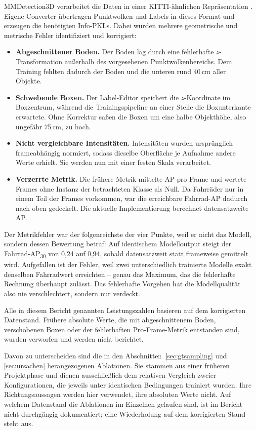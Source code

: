 MMDetection3D \cite{mmdet3d2020} verarbeitet die Daten in einer KITTI-ähnlichen Repräsentation \cite{geiger2012kitti}. Eigene Converter übertragen Punktwolken und Labels in dieses Format und erzeugen die benötigten Info-PKLs. Dabei wurden mehrere geometrische und metrische Fehler identifiziert und korrigiert:

\begin{itemize}
    \item \textbf{Abgeschnittener Boden.} Der Boden lag durch eine fehlerhafte \(z\)-Transformation außerhalb des vorgesehenen Punktwolkenbereichs. Dem Training fehlten dadurch der Boden und die unteren rund 40\,cm aller Objekte.
    \item \textbf{Schwebende Boxen.} Der Label-Editor speichert die \(z\)-Koordinate im Boxzentrum, während die Trainingspipeline an einer Stelle die Boxunterkante erwartete. Ohne Korrektur saßen die Boxen um eine halbe Objekthöhe, also ungefähr 75\,cm, zu hoch.
    \item \textbf{Nicht vergleichbare Intensitäten.} Intensitäten wurden ursprünglich frameabhängig normiert, sodass dieselbe Oberfläche je Aufnahme andere Werte erhielt. Sie werden nun mit einer festen Skala verarbeitet.
    \item \textbf{Verzerrte Metrik.} Die frühere Metrik mittelte AP pro Frame und wertete Frames ohne Instanz der betrachteten Klasse als Null. Da Fahrräder nur in einem Teil der Frames vorkommen, war die erreichbare Fahrrad-AP dadurch nach oben gedeckelt. Die aktuelle Implementierung berechnet datensatzweite AP.
\end{itemize}

Der Metrikfehler war der folgenreichste der vier Punkte, weil er nicht das Modell, sondern dessen Bewertung betraf: Auf identischem Modelloutput steigt der Fahrrad-AP\textsubscript{30} von 0{,}24 auf 0{,}94, sobald datensatzweit statt frameweise gemittelt wird. Aufgefallen ist der Fehler, weil zwei unterschiedlich trainierte Modelle exakt denselben Fahrradwert erreichten -- genau das Maximum, das die fehlerhafte Rechnung überhaupt zulässt. Das fehlerhafte Vorgehen hat die Modellqualität also nie verschlechtert, sondern nur verdeckt.

Alle in diesem Bericht genannten Leistungszahlen basieren auf dem korrigierten Datenstand. Frühere absolute Werte, die mit abgeschnittenem Boden, verschobenen Boxen oder der fehlerhaften Pro-Frame-Metrik entstanden sind, wurden verworfen und werden nicht berichtet.

Davon zu unterscheiden sind die in den Abschnitten~\ref{sec:gtsampling} und \ref{sec:ursachen} herangezogenen Ablationen. Sie stammen aus einer früheren Projektphase und dienen ausschließlich dem relativen Vergleich zweier Konfigurationen, die jeweils unter identischen Bedingungen trainiert wurden. Ihre Richtungsaussagen werden hier verwendet, ihre absoluten Werte nicht. Auf welchem Datenstand die Ablationen im Einzelnen gelaufen sind, ist im Bericht nicht durchgängig dokumentiert; eine Wiederholung auf dem korrigierten Stand steht aus.
